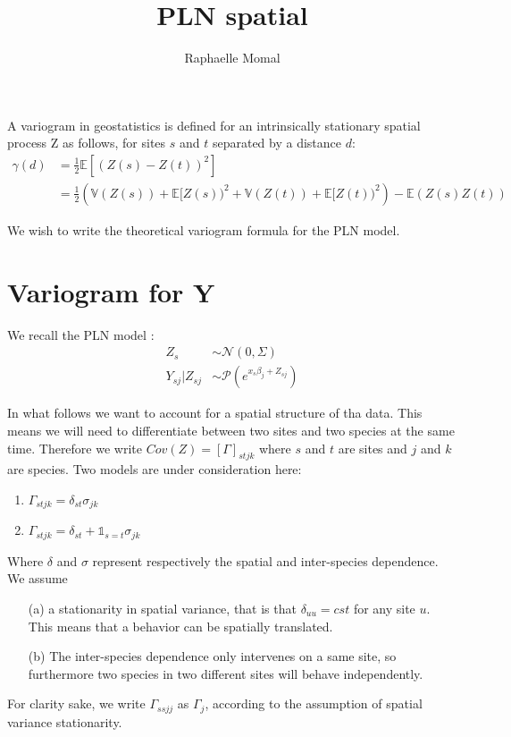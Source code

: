 \documentclass[10pt,a4paper]{article}
\author{Raphaelle Momal}
\title{PLN spatial}
\newcommand{\esp}{\mathds{E}}
\newcommand{\var}{\mathds{V}}
\begin{document}
\maketitle
A variogram in geostatistics is defined for an intrinsically stationary spatial process Z as follows, for sites $s$ and $t$ separated by a distance $d$:
\begin{align*}
 \gamma (d) &=  \frac{1}{2} \esp[(Z(s) - Z(t) )^2]\\
 &=\frac{1}{2} \left(\var(Z(s)) + \esp[Z(s))^2 + \var(Z(t)) + \esp[Z(t))^2 \right) - \esp(Z(s)Z(t))
\end{align*}

We wish to write the theoretical variogram formula for the PLN model.
\section{Variogram for  Y}
We recall the PLN model :
\begin{align*}
Z_s &\sim \mathcal{N}(0,\Sigma)\\
Y_{sj}|Z_{sj} &\sim \mathcal{P}(e^{x_s \beta_j + Z_{sj}}) 
\end{align*}

In what follows we want to account for a spatial structure of tha data. This means we will need to differentiate between two sites and two species at the same time. Therefore we write $Cov(Z) = [\Gamma]_{stjk}$ where $s$ and $t$ are sites and $j$ and $k$ are species. Two models are under consideration here:
\begin{enumerate}
\item $\Gamma_{stjk} = \delta_{st} \sigma_{jk}$
\item $\Gamma_{stjk} = \delta_{st} + \mathds{1}_{s=t}\sigma_{jk}$
\end{enumerate}
Where $\delta$ and $\sigma$ represent respectively the spatial and inter-species dependence.  We  assume 
\begin{itemize}
\item [(a)] a stationarity in spatial variance, that is that $\delta_{uu} = cst$ for any site $u$. This means that  a behavior can be spatially translated. 
\item [(b)] The inter-species dependence only  intervenes  on a same site, so furthermore two species in two different sites will behave independently.  

\end{itemize}For clarity sake, we write $\Gamma_{ssjj}$ as $\Gamma_{j}$, according to the assumption of spatial variance stationarity. 
\end{document}
